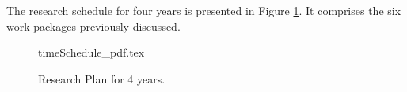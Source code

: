 The research schedule for four years is presented in Figure \ref{fig:timeSchedule}.
It comprises the six work packages previously discussed.
\begin{figure}[h]
  \centering
  \def\svgwidth{.7\columnwidth}
	{\small{timeSchedule_pdf.tex}}
	\caption{Research Plan for 4 years.} 
  \label{fig:timeSchedule}
\end{figure}




